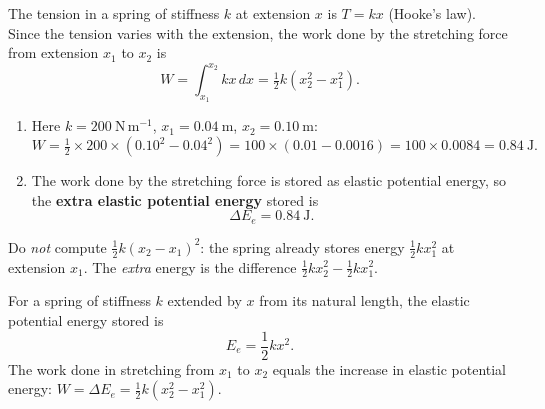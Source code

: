 \documentclass[11pt]{article}
\begin{document}
\begin{corrige}
The tension in a spring of stiffness $k$ at extension $x$ is $T = kx$ (Hooke's law). Since the tension varies with the extension, the work done by the stretching force from extension $x_{1}$ to $x_{2}$ is
\[
W = \int_{x_{1}}^{x_{2}} kx\,dx = \tfrac{1}{2}k\left(x_{2}^{2} - x_{1}^{2}\right).
\]

\begin{enumerate}
\item Here $k = 200\ \mathrm{N\,m^{-1}}$, $x_{1} = 0.04\ \mathrm{m}$, $x_{2} = 0.10\ \mathrm{m}$:
\[
W = \tfrac{1}{2}\times 200\times\left(0.10^{2} - 0.04^{2}\right) = 100\times(0.01 - 0.0016) = 100\times 0.0084 = 0.84\ \mathrm{J}.
\]

\item The work done by the stretching force is stored as elastic potential energy, so the \textbf{extra elastic potential energy} stored is
\[
\Delta E_{e} = 0.84\ \mathrm{J}.
\]
\end{enumerate}

\begin{attention}
Do \emph{not} compute $\tfrac{1}{2}k(x_{2}-x_{1})^{2}$: the spring already stores energy $\tfrac{1}{2}kx_{1}^{2}$ at extension $x_{1}$. The \emph{extra} energy is the difference $\tfrac{1}{2}kx_{2}^{2}-\tfrac{1}{2}kx_{1}^{2}$.
\end{attention}

\begin{propriete}
For a spring of stiffness $k$ extended by $x$ from its natural length, the elastic potential energy stored is
\[
E_e = \frac{1}{2}kx^2.
\]
The work done in stretching from $x_1$ to $x_2$ equals the increase in elastic potential energy: $W = \Delta E_e = \frac{1}{2}k(x_2^2 - x_1^2)$.
\end{propriete}
\end{corrige}
\end{document}

